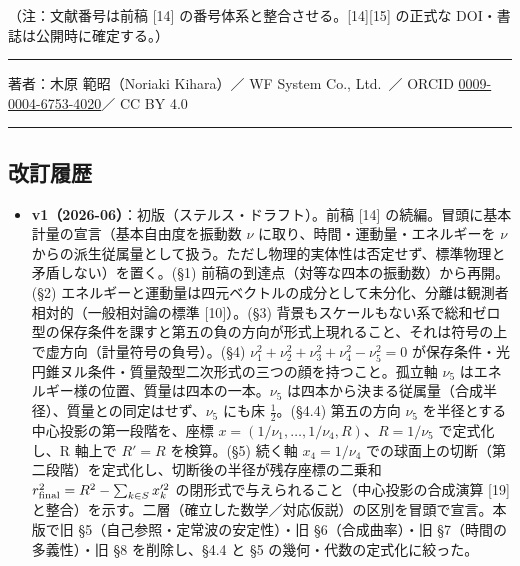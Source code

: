 \documentclass[
]{ltjsarticle}
\providecommand{\tightlist}{%
  \setlength{\itemsep}{0pt}\setlength{\parskip}{0pt}}
\begin{document}
（注：文献番号は前稿 {[}14{]} の番号体系と整合させる。{[}14{]}{[}15{]}
の正式な DOI・書誌は公開時に確定する。）

\begin{center}\rule{0.5\linewidth}{0.5pt}\end{center}

著者：木原 範昭（Noriaki Kihara）／ WF System Co., Ltd.~／ ORCID
\href{https://orcid.org/0009-0004-6753-4020}{0009-0004-6753-4020}／ CC
BY 4.0

\begin{center}\rule{0.5\linewidth}{0.5pt}\end{center}

\subsection{改訂履歴}\label{ux6539ux8a02ux5c65ux6b74}

\begin{itemize}
\tightlist
\item
  \textbf{v1（2026-06）}：初版（ステルス・ドラフト）。前稿 {[}14{]}
  の続編。冒頭に基本計量の宣言（基本自由度を振動数 \(\nu\)
  に取り、時間・運動量・エネルギーを \(\nu\)
  からの派生従属量として扱う。ただし物理的実体性は否定せず、標準物理と矛盾しない）を置く。(§1)
  前稿の到達点（対等な四本の振動数）から再開。(§2)
  エネルギーと運動量は四元ベクトルの成分として未分化、分離は観測者相対的（一般相対論の標準
  {[}10{]}）。(§3)
  背景もスケールもない系で総和ゼロ型の保存条件を課すと第五の負の方向が形式上現れること、それは符号の上で虚方向（計量符号の負号）。(§4)
  \(\nu_1^2+\nu_2^2+\nu_3^2+\nu_4^2-\nu_5^2=0\)
  が保存条件・光円錐ヌル条件・質量殻型二次形式の三つの顔を持つこと。孤立軸
  \(\nu_5\) はエネルギー様の位置、質量は四本の一本。\(\nu_5\)
  は四本から決まる従属量（合成半径）、質量との同定はせず、\(\nu_5\)
  にも床 \(\tfrac12\)。(§4.4) 第五の方向 \(\nu_5\)
  を半径とする中心投影の第一段階を、座標
  \(x=(1/\nu_1,\dots,1/\nu_4,R)\)、\(R=1/\nu_5\) で定式化し、R 軸上で
  \(R'=R\) を検算。(§5) 続く軸 \(x_4=1/\nu_4\)
  での球面上の切断（第二段階）を定式化し、切断後の半径が残存座標の二乗和
  \(r_{\rm final}^2=R^2-\sum_{k\in S}x_k'^2\)
  の閉形式で与えられること（中心投影の合成演算 {[}19{]}
  と整合）を示す。二層（確立した数学／対応仮説）の区別を冒頭で宣言。本版で旧
  §5（自己参照・定常波の安定性）・旧 §6（合成曲率）・旧
  §7（時間の多義性）・旧 §8 を削除し、§4.4 と §5
  の幾何・代数の定式化に絞った。
\end{itemize}
\end{document}
